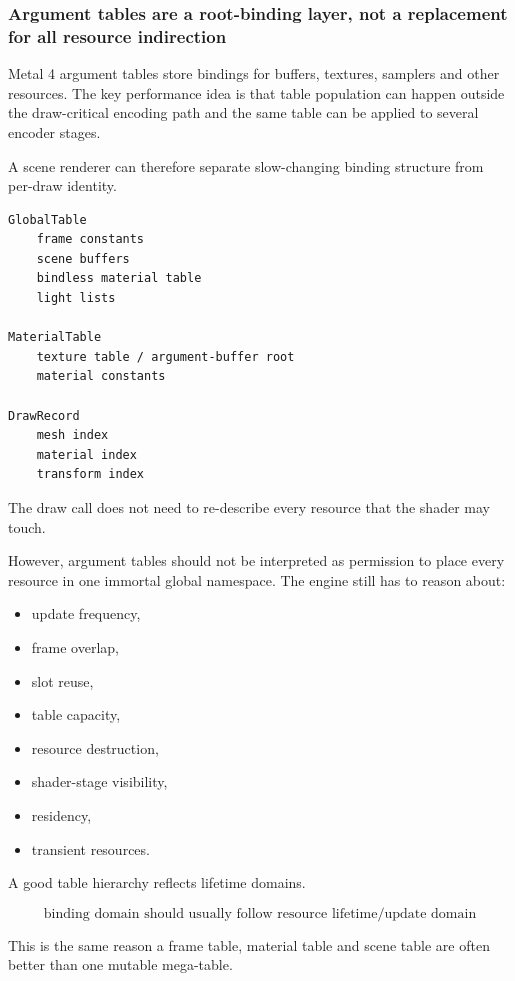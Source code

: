 \subsubsection{Argument tables are a root-binding layer, not a replacement for all resource indirection}\label{05-engine-i-ch022-argument-tables-are-a-root-binding-layer-not-a-replacement-for-all-resource-indirection}

Metal 4 argument tables store bindings for buffers, textures, samplers and other resources. The key performance idea is that table population can happen outside the draw-critical encoding path and the same table can be applied to several encoder stages.

A scene renderer can therefore separate slow-changing binding structure from per-draw identity.

\begin{verbatim}
GlobalTable
    frame constants
    scene buffers
    bindless material table
    light lists

MaterialTable
    texture table / argument-buffer root
    material constants

DrawRecord
    mesh index
    material index
    transform index
\end{verbatim}

The draw call does not need to re-describe every resource that the shader may touch.

However, argument tables should not be interpreted as permission to place every resource in one immortal global namespace. The engine still has to reason about:

\begin{itemize}
\tightlist
\item
  update frequency,
\item
  frame overlap,
\item
  slot reuse,
\item
  table capacity,
\item
  resource destruction,
\item
  shader-stage visibility,
\item
  residency,
\item
  transient resources.
\end{itemize}

A good table hierarchy reflects lifetime domains.

\[
\boxed{
\text{binding domain should usually follow resource lifetime/update domain}
}
\]

This is the same reason a frame table, material table and scene table are often better than one mutable mega-table.

